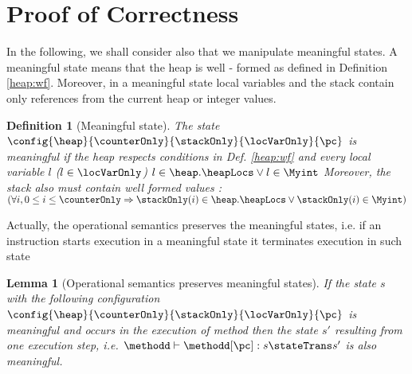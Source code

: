 
\newtheorem{proofDef}{Definition}[section] 
\newtheorem{lemma}{Lemma}[section] %
\newtheorem*{vcGenCorrect1}{Theorem  \ref{vcGenCorrect}}
\newcommand{\state}[1]{ \tau_{#1} } 
\newcommand{\straightBraces}[1]{ \texttt{ (} #1 \texttt{ )} }
\newcommand{\tbc}{\textit{TBC}}


\section{Proof of Correctness } \label{proof}

In the following, we shall consider also that we manipulate meaningful states. A meaningful state means that the heap is 
well - formed as defined in Definition \ref{heap:wf}. Moreover, in a meaningful state local variables and the stack  contain only 
 references from the current heap or integer values.
\begin{proofDef}[Meaningful state]\label{meaningful}
The state $\config{\heap}{\counterOnly}{\stackOnly}{\locVarOnly}{\pc}  $ is meaningful if the heap respects conditions in Def. \ref{heap:wf}
and every local variable   $ l $ ($l \in \locVarOnly $)  $ l \in \heap.\heapLocs \vee l \in \Myint  $ 
Moreover, the stack also must contain well formed values : 
$ (\forall i, 0 \le i \le \counterOnly \Rightarrow \stackOnly(i) \in \heap.\heapLocs \vee \stackOnly(i)\in \Myint   )$
\end{proofDef}

Actually, the operational semantics preserves the meaningful states, i.e. if an instruction starts execution in a meaningful state 
it terminates execution in such state

\begin{lemma}[Operational semantics preserves meaningful states]\label{proof:opPresMeaningful}
If the state  $s$  with the following configuration $\config{ \heap}{\counterOnly}{\stackOnly}{\locVarOnly}{ \pc}$ is meaningful  and occurs in
 the execution of method \methodd{} then the state $s'$ resulting from one execution step, i.e. 
 $\methodd \vdash \methodd[\pc] : s \stateTrans s' $ is also meaningful.  
\end{lemma}


